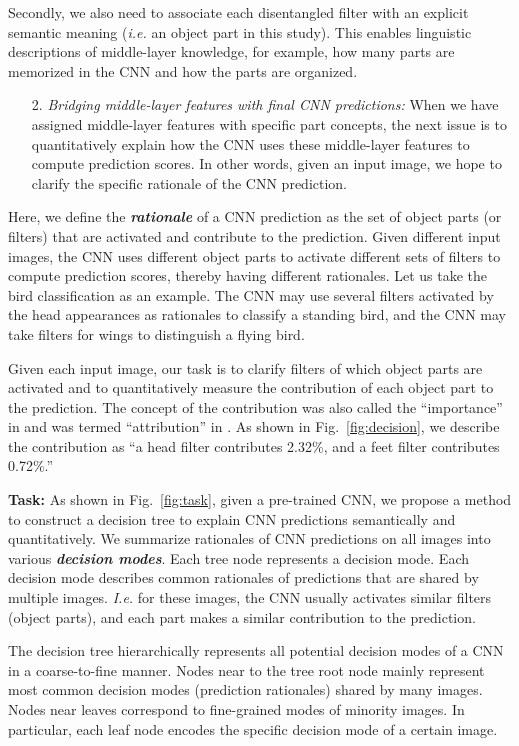 \documentclass[10pt,twocolumn,letterpaper]{article}
\begin{document}
Secondly, we also need to associate each disentangled filter with an explicit semantic meaning (\emph{i.e.} an object part in this study). This enables linguistic descriptions of middle-layer knowledge, for example, how many parts are memorized in the CNN and how the parts are organized.
\begin{enumerate}
\item[2.] \textit{Bridging middle-layer features with final CNN predictions:} When we have assigned middle-layer features with specific part concepts, the next issue is to quantitatively explain how the CNN uses these middle-layer features to compute prediction scores. In other words, given an input image, we hope to clarify the specific rationale of the CNN prediction.
\end{enumerate}
Here, we define the {\bf\textit{rationale}} of a CNN prediction as the set of object parts (or filters) that are activated and contribute to the prediction. Given different input images, the CNN uses different object parts to activate different sets of filters to compute prediction scores, thereby having different rationales. Let us take the bird classification as an example. The CNN may use several filters activated by the head appearances as rationales to classify a standing bird, and the CNN may take filters for wings to distinguish a flying bird.

Given each input image, our task is to clarify filters of which object parts are activated and to quantitatively measure the contribution of each object part to the prediction. The concept of the contribution was also called the ``importance'' in \cite{trust,shap} and was termed ``attribution'' in \cite{patternNet}. As shown in Fig.~\ref{fig:decision}, we describe the contribution as ``a head filter contributes 2.32\%, and a feet filter contributes 0.72\%.''

\textbf{Task:} As shown in Fig.~\ref{fig:task}, given a pre-trained CNN, we propose a method to construct a decision tree to explain CNN predictions semantically and quantitatively. We summarize rationales of CNN predictions on all images into various {\bf\textit{decision modes}}. Each tree node represents a decision mode. Each decision mode describes common rationales of predictions that are shared by multiple images. \emph{I.e.} for these images, the CNN usually activates similar filters (object parts), and each part makes a similar contribution to the prediction.

The decision tree hierarchically represents all potential decision modes of a CNN in a coarse-to-fine manner. Nodes near to the tree root node mainly represent most common decision modes (prediction rationales) shared by many images. Nodes near leaves correspond to fine-grained modes of minority images. In particular, each leaf node encodes the specific decision mode of a certain image.
\end{document}
